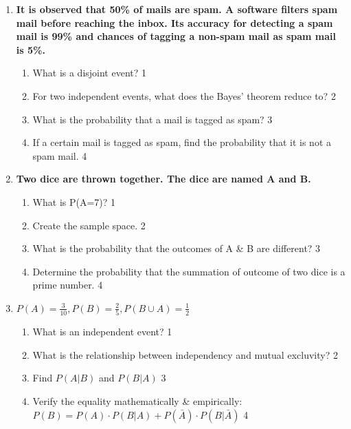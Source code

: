 \documentclass{article}
\begin{document}
  \begin{enumerate}
  
     \item
	  \textbf{It is observed that 50\% of mails are spam. A software filters spam mail before reaching the inbox. Its accuracy for detecting a spam mail is 99\% and chances of tagging a non-spam mail as spam mail is 5\%.} 
  
  \begin{enumerate}
    \item
	What is a disjoint event? \hfill 1
    \item
	For two independent events, what does the Bayes' theorem reduce to? \hfill 2
    \item  
	What is the probability that a mail is tagged as spam?  \hfill 3
    \item
	If a certain mail is tagged as spam, find the probability that it is not a spam mail. \hfill 4
  \end{enumerate}

 \item
	  \textbf{Two dice are thrown together. The dice are named A and B.} 
  
  \begin{enumerate}
    \item
	What is P(A=7)? \hfill 1
    \item
	Create the sample space. \hfill 2
    \item  
	What is the probability that the outcomes of A \& B are different? \hfill 3
    \item
	Determine the probability that the summation of outcome of two dice is a prime number. \hfill 4
  \end{enumerate}
  
   \item
	  \textbf{$P(A) = \frac{3}{10}, P(B) = \frac 25, P(B\cup A) = \frac12$} 
  
  \begin{enumerate}
    \item
	What is an independent event? \hfill 1
    \item
	What is the relationship between independency and mutual excluvity? \hfill 2
    \item  
	Find $P(A \vert B)$ and $P(B \vert A)$ \hfill 3
    \item
	Verify the equality mathematically \& empirically: $P(B) = P(A) \cdot P(B \vert A) + P(\bar A) \cdot P(B \vert \bar A)$ \hfill 4
  \end{enumerate}
  

\end{enumerate}
\end{document}
